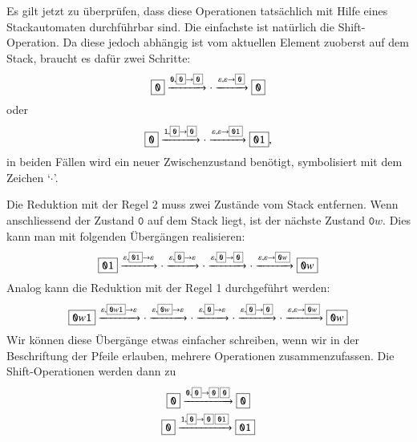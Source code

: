 Es gilt jetzt zu überprüfen, dass diese Operationen tatsächlich mit
Hilfe eines Stackautomaten durchführbar sind.
Die einfachste ist natürlich die Shift-Ope\-ration.
Da diese jedoch abhängig ist vom aktuellen Element zuoberst
auf dem Stack, braucht es dafür zwei Schritte:
\[
\boxed{\texttt{0}}\xrightarrow{\texttt{0},\scalebox{0.7}{\boxed{\texttt{0}}$\rightarrow$\boxed{\texttt{0}}}}\cdot
\xrightarrow{\varepsilon,\varepsilon\rightarrow\scalebox{0.7}{\boxed{\texttt{0}}}}\boxed{\texttt{0}}
\]
oder
\[
\boxed{\texttt{0}}\xrightarrow{\texttt{1},\scalebox{0.7}{\boxed{\texttt{0}}$\rightarrow$\boxed{\texttt{0}}}}\cdot
\xrightarrow{\varepsilon,\varepsilon\rightarrow\scalebox{0.7}{\boxed{\texttt{01}}}}\boxed{\texttt{01}},
\]
in beiden Fällen wird ein neuer Zwischenzustand benötigt, symbolisiert mit dem Zeichen
`$\cdot$'.

Die Reduktion mit der Regel 2 muss zwei Zustände vom Stack entfernen.
Wenn anschliessend der Zustand $\boxed{\texttt{0}}$ auf dem Stack liegt, ist der
nächste Zustand $\boxed{\texttt{0}w}$.
Dies kann man mit folgenden Übergängen
realisieren:
\[
\boxed{\texttt{01}}
\xrightarrow{\varepsilon,\scalebox{0.7}{\boxed{\texttt{01}}}\to\varepsilon}
\cdot
\xrightarrow{\varepsilon,\scalebox{0.7}{\boxed{\texttt{0}}}\to\varepsilon}
\cdot
\xrightarrow{\varepsilon,\scalebox{0.7}{\boxed{\texttt{0}}}\to\scalebox{0.7}{\boxed{\texttt{0}}}}
\cdot
\xrightarrow{\varepsilon,\varepsilon\to\scalebox{0.7}{\boxed{\texttt{0}w}}}
\boxed{\texttt{0}w}
\]
Analog kann die Reduktion mit der Regel 1 durchgeführt werden:
\[
\boxed{\texttt{0}w\texttt{1}}
\xrightarrow{\varepsilon,\scalebox{0.7}{\boxed{\texttt{0}w\texttt{1}}}\to\varepsilon}
\cdot
\xrightarrow{\varepsilon,\scalebox{0.7}{\boxed{\texttt{0}w}}\to\varepsilon}
\cdot
\xrightarrow{\varepsilon,\scalebox{0.7}{\boxed{\texttt{0}}}\to\varepsilon}
\cdot
\xrightarrow{\varepsilon,\scalebox{0.7}{\boxed{\texttt{0}}}\to\scalebox{0.7}{\boxed{\texttt{0}}}}
\cdot
\xrightarrow{\varepsilon,\varepsilon\to\scalebox{0.7}{\boxed{\texttt{0}w}}}
\boxed{\texttt{0}w}
\]
Wir können diese Übergänge etwas einfacher schreiben, wenn wir in der
Beschriftung der Pfeile erlauben, mehrere Operationen zusammenzufassen.
Die Shift-Ope\-rationen werden dann zu
\begin{gather*}
\boxed{\texttt{0}}\xrightarrow{\texttt{0},\scalebox{0.7}{\boxed{\texttt{0}}$\rightarrow$\boxed{\texttt{0}}\,\boxed{\texttt{0}}}}\boxed{\texttt{0}}
\\
\boxed{\texttt{0}}\xrightarrow{\texttt{1},\scalebox{0.7}{\boxed{\texttt{0}}$\rightarrow$\boxed{\texttt{0}}\,\boxed{\texttt{01}}}}\boxed{\texttt{01}}
\end{gather*}
